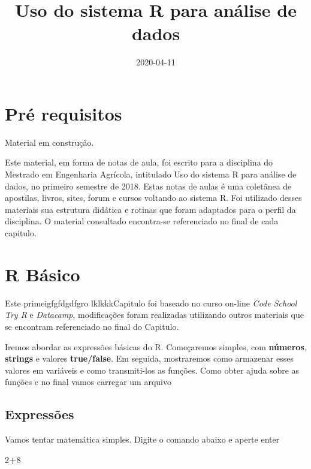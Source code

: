 \documentclass[]{book}
\title{Uso do sistema R para análise de dados}
\author{}
\date{2020-04-11}
\newenvironment{Shaded}{\begin{snugshade}}{\end{snugshade}}
\newcommand{\DecValTok}[1]{\textcolor[rgb]{0.00,0.00,0.81}{#1}}
\newcommand{\OperatorTok}[1]{\textcolor[rgb]{0.81,0.36,0.00}{\textbf{#1}}}
\begin{document}
\maketitle

{
\setcounter{tocdepth}{1}
\tableofcontents
}
\hypertarget{pre-requisitos}{%
\chapter{Pré requisitos}\label{pre-requisitos}}

Material em construção.

Este material, em forma de notas de aula, foi escrito para a disciplina do Mestrado em Engenharia Agrícola, intitulado Uso do sistema R para análise de dados, no primeiro semestre de 2018.
Estas notas de aulas é uma coletânea de apostilas, livros, sites, forum e cursos voltando ao sistema R. Foi utilizado desses materiais sua estrutura didática e rotinas que foram adaptados para o perfil da disciplina.
O material consultado encontra-se referenciado no final de cada capitulo.

\hypertarget{intro}{%
\chapter{R Básico}\label{intro}}

Este primeigfgfdgdfgro lklkkkCapitulo foi baseado no curso on-line \emph{Code School Try R} e \emph{Datacamp}, modificações foram realizadas utilizando outros materiais que se encontram referenciado no final do Capitulo.

Iremos abordar as expressões básicas do R.
Começaremos simples, com \textbf{números}, \textbf{strings} e valores \textbf{true/false}. Em seguida, mostraremos como armazenar esses valores em variáveis e como transmiti-los as funções. Como obter ajuda sobre as funções e no final vamos carregar um arquivo

\hypertarget{expressoes}{%
\section{Expressões}\label{expressoes}}

Vamos tentar matemática simples. Digite o comando abaixo e aperte enter

\begin{Shaded}
\begin{Highlighting}[]
\DecValTok{2}\OperatorTok{+}\DecValTok{8}
\end{Highlighting}
\end{Shaded}
\end{document}

